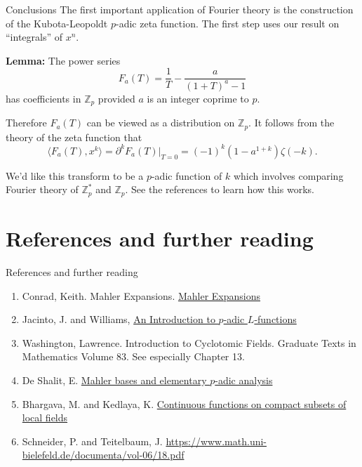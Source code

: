 \documentclass[
  ignorenonframetext,
]{beamer}
\providecommand{\tightlist}{%
  \setlength{\itemsep}{0pt}\setlength{\parskip}{0pt}}
\begin{document}
\begin{frame}{Conclusions}
The first important application of Fourier theory is the construction of
the Kubota-Leopoldt \(p\)-adic zeta function. The first step uses our
result on ``integrals'' of \(x^{n}\).

\textbf{Lemma:} The power series \[
F_{a}(T)=\frac{1}{T}-\frac{a}{(1+T)^{a}-1}
\] has coefficients in \(\mathbb{Z}_p\) provided \(a\) is an integer
coprime to \(p\).

Therefore \(F_a(T)\) can be viewed as a distribution on
\(\mathbb{Z}_p\). It follows from the theory of the zeta function that
\[
\langle F_a(T),x^k\rangle = \partial^{k}F_{a}(T)|_{T=0}=(-1)^k(1-a^{1+k})\zeta(-k).
\]

We'd like this transform to be a \(p\)-adic function of \(k\) which
involves comparing Fourier theory of \(\mathbb{Z}_p^{*}\) and
\(\mathbb{Z}_p\). See the references to learn how this works.
\end{frame}

\hypertarget{references-and-further-reading}{%
\section{References and further
reading}\label{references-and-further-reading}}

\begin{frame}{References and further reading}
\begin{enumerate}
\tightlist
\item
  Conrad, Keith. Mahler Expansions.
  \href{https://kconrad.math.uconn.edu/blurbs/gradnumthy/mahlerexpansions.pdf}{Mahler Expansions}
\item
  Jacinto, J. and Williams,
  \href{https://warwick.ac.uk/fac/sci/maths/people/staff/cwilliams/lecturenotes/lecturenotes-change.pdf}{An Introduction to $p$-adic $L$-functions}
\item
  Washington, Lawrence. Introduction to Cyclotomic Fields. Graduate
  Texts in Mathematics Volume 83. See especially Chapter 13.
\item
  De Shalit, E.
  \href{http://www.ma.huji.ac.il/~deshalit/new_site/files/Mahler.pdf}{Mahler bases and elementary $p$-adic analysis}
\item
  Bhargava, M. and Kedlaya, K.
  \href{https://eudml.org/doc/207350}{Continuous functions on compact subsets of local fields}
\item
  Schneider, P. and Teitelbaum, J.
  \href{$p$-adic Fourier Theory}{https://www.math.uni-bielefeld.de/documenta/vol-06/18.pdf}
\end{enumerate}
\end{frame}
\end{document}
